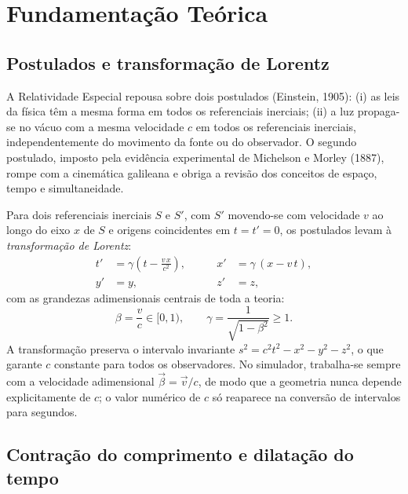 \documentclass[10pt,a4paper,twocolumn]{article}
\begin{document}
\section{Fundamentação Teórica}

\subsection{Postulados e transformação de Lorentz}

A Relatividade Especial repousa sobre dois postulados (Einstein, 1905): (i) as leis da
física têm a mesma forma em todos os referenciais inerciais; (ii) a luz propaga-se no vácuo
com a mesma velocidade $c$ em todos os referenciais inerciais, independentemente do
movimento da fonte ou do observador. O segundo postulado, imposto pela evidência
experimental de Michelson e Morley (1887), rompe com a cinemática galileana e obriga a
revisão dos conceitos de espaço, tempo e simultaneidade.

Para dois referenciais inerciais $S$ e $S'$, com $S'$ movendo-se com velocidade $v$ ao
longo do eixo $x$ de $S$ e origens coincidentes em $t = t' = 0$, os postulados levam à
\emph{transformação de Lorentz}:
\begin{equation}
  \begin{aligned}
    t' &= \gamma\left(t - \frac{v\,x}{c^{2}}\right), \qquad &
    x' &= \gamma\,(x - v\,t),\\
    y' &= y, & z' &= z,
  \end{aligned}
  \label{eq:lorentz}
\end{equation}
com as grandezas adimensionais centrais de toda a teoria:
\begin{equation}
  \beta = \frac{v}{c} \in [0,1), \qquad
  \gamma = \frac{1}{\sqrt{1-\beta^{2}}} \geq 1.
  \label{eq:gamma}
\end{equation}
A transformação preserva o intervalo invariante
$s^{2} = c^{2}t^{2} - x^{2} - y^{2} - z^{2}$, o que garante $c$ constante para todos os
observadores. No simulador, trabalha-se sempre com a velocidade adimensional
$\vec{\beta} = \vec{v}/c$, de modo que a geometria nunca depende explicitamente de $c$; o
valor numérico de $c$ só reaparece na conversão de intervalos para segundos.

\subsection{Contração do comprimento e dilatação do tempo}
\end{document}
